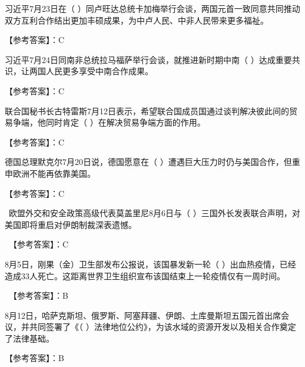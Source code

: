 \question 习近平7月23日在（
）同卢旺达总统卡加梅举行会谈，两国元首一致同意共同推动双方互利合作结出更加丰硕成果，为中卢人民、中非人民带来更多福祉。
\par{}
\begin{solution}【参考答案】：C
\end{solution}
\question 习近平7月24日同南非总统拉马福萨举行会谈，就推进新时期中南（
）达成重要共识，让两国人民更多享受中南合作成果。
\par{}
\begin{solution}【参考答案】：C
\end{solution}
\question 联合国秘书长古特雷斯7月12日表示，希望联合国成员国通过谈判解决彼此间的贸易争端，他同时肯定（
）在解决贸易争端方面的作用。
\par{}
\begin{solution}【参考答案】：C
\end{solution}
\question 德国总理默克尔7月20日说，德国愿意在（
）遭遇巨大压力时仍与美国合作，但重申欧洲不能再依靠美国。
\par{}
\begin{solution}【参考答案】：C
\end{solution}
\question ~欧盟外交和安全政策高级代表莫盖里尼8月6日与（
）三国外长发表联合声明，对美国即将重启对伊朗制裁深表遗憾。
\par{}
\begin{solution}~【参考答案】：C~~
\end{solution}
\question 8月5日，刚果（金）卫生部发布公报说，该国暴发新一轮（
）出血热疫情，已经造成33人死亡。这距离世界卫生组织宣布该国结束上一轮疫情仅有一周时间。
\par{}
\begin{solution}~【参考答案】：B
\end{solution}
\question 8月12日，哈萨克斯坦、俄罗斯、阿塞拜疆、伊朗、土库曼斯坦五国元首出席会议，并共同签署了《（
）法律地位公约》，为该水域的资源开发以及相关合作奠定了法律基础。
\par{}
\begin{solution}【参考答案】：B~
\end{solution}
